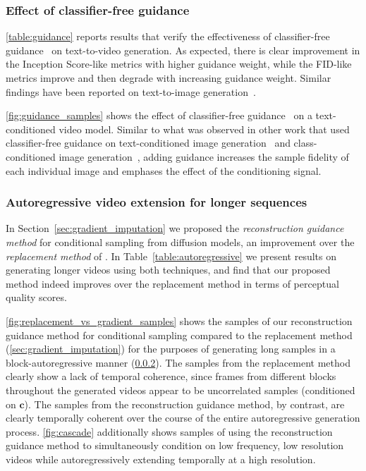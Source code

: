 \subsubsection{Effect of classifier-free guidance}

\ref{table:guidance} reports results that verify the effectiveness of classifier-free guidance~\citep{ho2021classifier} on text-to-video generation. As expected, there is clear improvement in the Inception Score-like metrics with higher guidance weight, while the FID-like metrics improve and then degrade with increasing guidance weight. Similar findings have been reported on text-to-image generation~\citep{nichol2021glide}. 

\ref{fig:guidance_samples} shows the effect of classifier-free guidance~\citep{ho2021classifier} on a text-conditioned video model. Similar to what was observed in other work that used classifier-free guidance on text-conditioned image generation~\citep{nichol2021glide} and class-conditioned image generation~\citep{ho2021classifier,dhariwal2021diffusion}, adding guidance increases the sample fidelity of each individual image and emphases the effect of the conditioning signal.

\subsubsection{Autoregressive video extension for longer sequences}
\label{sec:longer}
In Section~\ref{sec:gradient_imputation} we proposed the \emph{reconstruction guidance method} for conditional sampling from diffusion models, an improvement over the \emph{replacement method} of \cite{song2020score}. In Table~\ref{table:autoregressive} we present results on generating longer videos using both  techniques, and find that our proposed method indeed improves over the replacement method in terms of perceptual quality scores. 

\ref{fig:replacement_vs_gradient_samples} shows the samples of our reconstruction guidance method for conditional sampling compared to the replacement method (\ref{sec:gradient_imputation}) for the purposes of generating long samples in a block-autoregressive manner (\ref{sec:longer}). The samples from the replacement method clearly show a lack of temporal coherence, since frames from different blocks throughout the generated videos appear to be uncorrelated samples (conditioned on $\mathbf{c}$). The samples from the reconstruction guidance method, by contrast, are clearly temporally coherent over the course of the entire autoregressive generation process. \ref{fig:cascade} additionally shows samples of using the reconstruction guidance method to simultaneously condition on low frequency, low resolution videos while autoregressively extending temporally at a high resolution.

